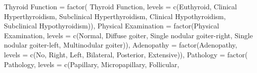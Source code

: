 \documentclass[
  letterpaper,
  DIV=11,
  numbers=noendperiod]{scrartcl}
\newenvironment{Shaded}{\begin{snugshade}}{\end{snugshade}}
\newcommand{\AttributeTok}[1]{\textcolor[rgb]{0.40,0.45,0.13}{#1}}
\newcommand{\FunctionTok}[1]{\textcolor[rgb]{0.28,0.35,0.67}{#1}}
\newcommand{\NormalTok}[1]{\textcolor[rgb]{0.00,0.23,0.31}{#1}}
\newcommand{\OtherTok}[1]{\textcolor[rgb]{0.00,0.23,0.31}{#1}}
\newcommand{\StringTok}[1]{\textcolor[rgb]{0.13,0.47,0.30}{#1}}
\begin{document}
\begin{Shaded}
\begin{Highlighting}[]
    \StringTok{\textasciigrave{}}\AttributeTok{Thyroid Function}\StringTok{\textasciigrave{}} \OtherTok{=} \FunctionTok{factor}\NormalTok{(}
      \StringTok{\textasciigrave{}}\AttributeTok{Thyroid Function}\StringTok{\textasciigrave{}}\NormalTok{,}
      \AttributeTok{levels =} \FunctionTok{c}\NormalTok{(}\StringTok{\textquotesingle{}Euthyroid\textquotesingle{}}\NormalTok{, }\StringTok{\textquotesingle{}Clinical Hyperthyroidism\textquotesingle{}}\NormalTok{,}
                 \StringTok{\textquotesingle{}Subclinical Hyperthyroidism\textquotesingle{}}\NormalTok{, }\StringTok{\textquotesingle{}Clinical Hypothyroidism\textquotesingle{}}\NormalTok{,}
                 \StringTok{\textquotesingle{}Subclinical Hypothyroidism\textquotesingle{}}\NormalTok{)),}
    \StringTok{\textasciigrave{}}\AttributeTok{Physical Examination}\StringTok{\textasciigrave{}} \OtherTok{=} \FunctionTok{factor}\NormalTok{(}\StringTok{\textasciigrave{}}\AttributeTok{Physical Examination}\StringTok{\textasciigrave{}}\NormalTok{,}
                                    \AttributeTok{levels =} \FunctionTok{c}\NormalTok{(}\StringTok{\textquotesingle{}Normal\textquotesingle{}}\NormalTok{, }\StringTok{\textquotesingle{}Diffuse goiter\textquotesingle{}}\NormalTok{, }
                                               \StringTok{\textquotesingle{}Single nodular goiter{-}right\textquotesingle{}}\NormalTok{,}
                                               \StringTok{\textquotesingle{}Single nodular goiter{-}left\textquotesingle{}}\NormalTok{, }
                                               \StringTok{\textquotesingle{}Multinodular goiter\textquotesingle{}}\NormalTok{)),}
    \AttributeTok{Adenopathy =} \FunctionTok{factor}\NormalTok{(Adenopathy,}
                        \AttributeTok{levels =} \FunctionTok{c}\NormalTok{(}\StringTok{\textquotesingle{}No\textquotesingle{}}\NormalTok{, }\StringTok{\textquotesingle{}Right\textquotesingle{}}\NormalTok{, }\StringTok{\textquotesingle{}Left\textquotesingle{}}\NormalTok{, }\StringTok{\textquotesingle{}Bilateral\textquotesingle{}}\NormalTok{, }
                                   \StringTok{\textquotesingle{}Posterior\textquotesingle{}}\NormalTok{, }\StringTok{\textquotesingle{}Extensive\textquotesingle{}}\NormalTok{)),}
    \AttributeTok{Pathology =} \FunctionTok{factor}\NormalTok{(}
\NormalTok{      Pathology,}
      \AttributeTok{levels =} \FunctionTok{c}\NormalTok{(}\StringTok{\textquotesingle{}Papillary\textquotesingle{}}\NormalTok{, }\StringTok{\textquotesingle{}Micropapillary\textquotesingle{}}\NormalTok{, }\StringTok{\textquotesingle{}Follicular\textquotesingle{}}\NormalTok{,}

\end{Highlighting}
\end{Shaded}
\end{document}
